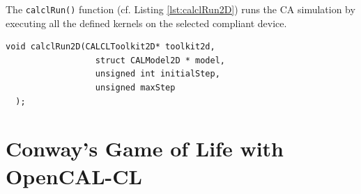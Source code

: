 The \verb'calclRun()' function (cf. Listing \ref{lst:calclRun2D}) runs the CA simulation by executing
all the defined kernels on the selected compliant device.

\begin{lstlisting}[float,floatplacement=H, label=lst:calclRun2D, caption=The calclRun2D function., numbers=none]
  void calclRun2D(CALCLToolkit2D* toolkit2d,
                  struct CALModel2D * model,
                  unsigned int initialStep,
                  unsigned maxStep
  );
\end{lstlisting}







\section{Conway's Game of Life with OpenCAL-CL}
 
